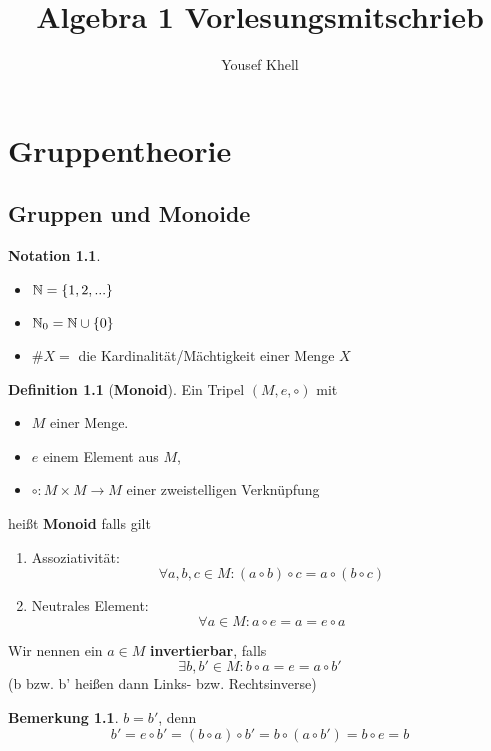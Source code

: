 \documentclass[a4paper]{report}
\title{\vspace{-2cm} Algebra 1 Vorlesungsmitschrieb}
\author{Yousef Khell}
\theoremstyle{plain}
\theoremstyle{definition}
\newtheorem{defi}[thm]{Definition}
\newtheorem*{bem*}{Bemerkung}
\newtheorem*{nota*}{Notation}
\begin{document}
\maketitle
\tableofcontents
\chapter{Gruppentheorie}
\section{Gruppen und Monoide}%
\label{sec:Gruppen und Monoide}
\begin{nota*} \item
\begin{itemize}
  \item $\Bbb N = \{1, 2, ...\}$
  \item $\Bbb N_{0} = \Bbb N \cup \{0\}$
\item $\#X = $ die Kardinalität/Mächtigkeit einer Menge $X$
\end{itemize}
\end{nota*}

\begin{defi}[\textbf{Monoid}] %
  Ein Tripel $(M, e, \circ)$ mit
  \begin{itemize}
 \item $M$ einer Menge.
 \item $e$ einem Element aus $M$,
 \item $\circ : M \times M \to M$ einer zweistelligen Verknüpfung
  \end{itemize}
  heißt \textbf{Monoid} falls gilt
  \begin{enumerate}[(M1)]
 \item Assoziativität: $$\forall a, b, c \in M : (a \circ b) \circ c = a \circ (b \circ c)$$
 \item Neutrales Element: $$\forall a \in M : a \circ e = a = e \circ a$$
  \end{enumerate}
  Wir nennen ein $a \in M$ \textbf{invertierbar}, falls $$\exists b, b' \in M : b \circ a = e = a \circ b'$$ (b bzw. b' heißen dann Links- bzw. Rechtsinverse)
 \begin{bem*}
$b = b'$, denn $$b' = e \circ b' = (b\circ a) \circ b' = b \circ (a \circ b') = b \circ e = b$$
 \end{bem*}
\end{defi}
\end{document}
